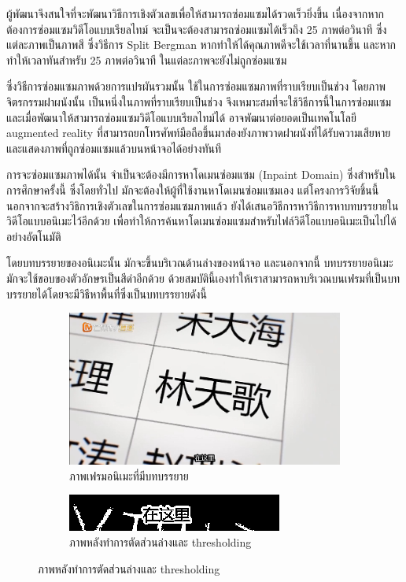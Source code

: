 \documentclass[hidelinks,a4paper,14pt]{article}
\numberwithin{equation}{section}							%
\begin{document}
{		%
		
		ผู้พัฒนาจึงสนใจที่จะพัฒนาวิธีการเชิงตัวเลขเพื่อให้สามารถซ่อมแซมได้รวดเร็วยิ่งขึ้น เนื่องจากหากต้องการซ่อมแซมวิดีโอแบบเรียลไทม์ จะเป็นจะต้องสามารถซ่อมแซมได้เร็วถึง 25 ภาพต่อวินาที ซึ่งแต่ละภาพเป็นภาพสี ซึ่งวิธีการ Split Bergman หากทำให้ได้คุณภาพดีจะใช้เวลาที่นานขึ้น และหากทำให้เวลาทันสำหรับ 25 ภาพต่อวินาที ในแต่ละภาพจะยังไม่ถูกซ่อมแซม
		
		
		
		ซึ่งวิธีการซ่อมแซมภาพด้วยการแปรผันรวมนั้น ใช้ในการซ่อมแซมภาพที่ราบเรียบเป็นช่วง โดยภาพจิตรกรรมฝาผนังนั้น เป็นหนึ่งในภาพที่ราบเรียบเป็นช่วง จึงเหมาะสมที่จะใช้วิธีการนี้ในการซ่อมแซม และเมื่อพัฒนาให้สามารถซ่อมแซมวิดีโอแบบเรียลไทม์ได้ อาจพัฒนาต่อยอดเป็นเทคโนโลยี augmented reality ที่สามารถยกโทรศัพท์มือถือขึ้นมาส่องยังภาพวาดฝาผนังที่ได้รับความเสียหายและแสดงภาพที่ถูกซ่อมแซมแล้วบนหน้าจอได้อย่างทันที
		
		
		การจะซ่อมแซมภาพได้นั้น จำเป็นจะต้องมีการหาโดเมนซ่อมแซม (Inpaint Domain) ซึ่งสำหรับในการศึกษาครั้งนี้ ซึ่งโดยทั่วไป มักจะต้องให้ผู้ที่ใช้งานหาโดเมนซ่อมแซมเอง แต่โครงการวิจัยชิ้นนี้นอกจากจะสร้างวิธิการเชิงตัวเลขในการซ่อมแซมภาพแล้ว ยังได้เสนอวิธีการหาวิธีการหาบทบรรยายในวิดีโอแบบอนิเมะไว้อีกด้วย เพื่อทำให้การค้นหาโดเมนซ่อมแซมสำหรับไฟล์วิดีโอแบบอนิเมะเป็นไปได้อย่างอัตโนมัติ
		
		โดยบทบรรยายของอนิเมะนั้น มักจะขึ้นบริเวณด้านล่างของหน้าจอ และนอกจากนี้ บทบรรยายอนิเมะมักจะใช้ขอบของตัวอักษรเป็นสีดำอีกด้วย ด้วยสมบัตินี้เองทำให้เราสามารถหาบริเวณบนเฟรมที่เป็นบทบรรยายได้โดยจะมีวิธีหาพื้นที่ซึ่งเป็นบทบรรยายดังนี้
		
		\begin{figure}[H]
			\begin{subfigure}{0.4\linewidth}
				\centering
				\includegraphics[width=0.4\linewidth]{images/detection-original.png}
				\caption{ภาพเฟรมอนิเมะที่มีบทบรรยาย}
			\end{subfigure}
			\begin{subfigure}{0.4\linewidth}
				\centering
				\includegraphics[width=0.4\linewidth]{images/detection-threshold.png}
				\caption{ภาพหลังทำการตัดส่วนล่างและ thresholding}
			\end{subfigure}
		\end{figure}
		
}
\end{document}
